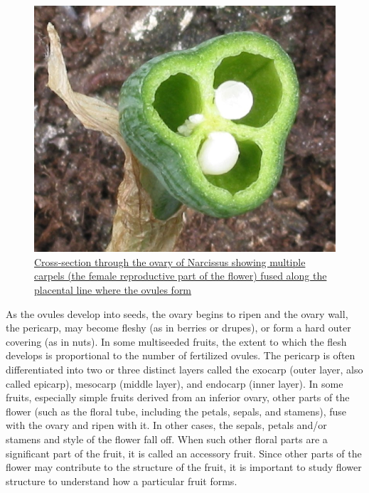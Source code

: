 \begin{figure}

{\centering \includegraphics[width=0.7\linewidth]{./figures/plants/Narcis_zaadhokken} 

}

\caption{\href{https://en.wikipedia.org/wiki/Gynoecium\#/media/File:Narcis_zaadhokken.jpg}{Cross-section through the ovary of Narcissus showing multiple carpels (the female reproductive part of the flower) fused along the placental line where the ovules form}}\label{fig:ovarycross}
\end{figure}

As the ovules develop into seeds, the ovary begins to ripen and the ovary wall, the pericarp, may become fleshy (as in berries or drupes), or form a hard outer covering (as in nuts). In some multiseeded fruits, the extent to which the flesh develops is proportional to the number of fertilized ovules. The pericarp is often differentiated into two or three distinct layers called the exocarp (outer layer, also called epicarp), mesocarp (middle layer), and endocarp (inner layer). In some fruits, especially simple fruits derived from an inferior ovary, other parts of the flower (such as the floral tube, including the petals, sepals, and stamens), fuse with the ovary and ripen with it. In other cases, the sepals, petals and/or stamens and style of the flower fall off. When such other floral parts are a significant part of the fruit, it is called an accessory fruit. Since other parts of the flower may contribute to the structure of the fruit, it is important to study flower structure to understand how a particular fruit forms.



